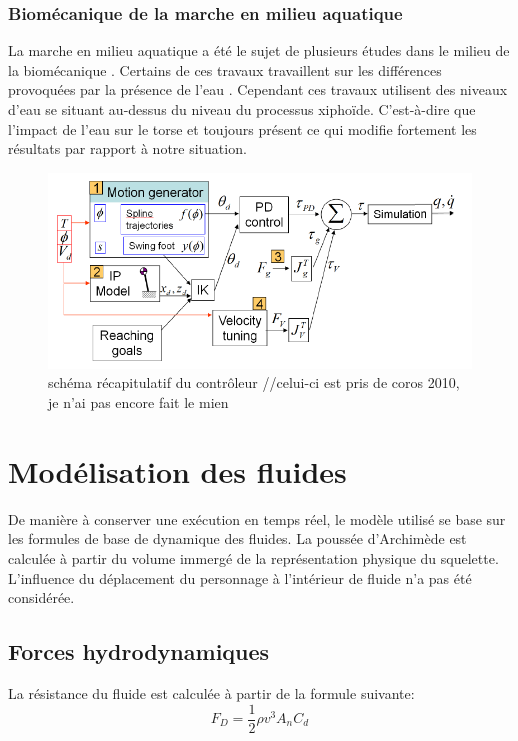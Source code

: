 \documentclass{llncs}
\begin{document}
\subsubsection{Biomécanique de la marche en milieu aquatique}
La marche en milieu aquatique a été le sujet de plusieurs études dans le milieu de la biomécanique \cite{barela2006biomechanical,chevutschi2009comparison,orselli2011joint,miyoshi2005functional}. Certains de ces travaux travaillent sur les différences provoquées par la présence de l'eau \cite{barela2006biomechanical}. Cependant ces travaux utilisent des niveaux d'eau se situant au-dessus du niveau du processus xiphoïde. C’est-à-dire que l'impact de l'eau sur le torse et toujours présent ce qui modifie fortement les résultats par rapport à notre situation.


\begin{figure}[h]
\centering
\includegraphics[scale=0.5]{system_overview.png}
\caption{schéma récapitulatif du contrôleur //celui-ci est pris de coros 2010, je n'ai pas encore fait le mien}
\label{fig:shema_controler}
\end{figure}

%
\section{Modélisation des fluides}
%
De manière à conserver une exécution en temps réel, le modèle utilisé se base sur les formules de base de dynamique des fluides. La poussée d'Archimède est calculée à partir du volume immergé de la représentation physique du squelette. L'influence du déplacement du personnage à l'intérieur de fluide n'a pas été considérée.
%
\subsection{Forces hydrodynamiques}
%
La résistance du fluide est calculée à partir de la formule suivante:
\[
F_D=\frac{1}{2} \rho v^3 A_n C_d
\]
\end{document}
